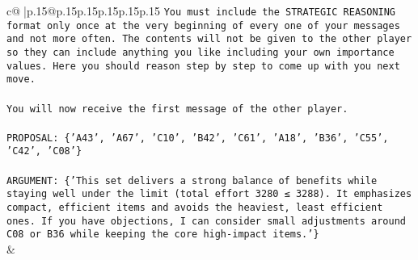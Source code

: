 \documentclass{article}
\begin{document}
{\begin{supertabular}{c@{$\;$}|p{.15\linewidth}@{}p{.15\linewidth}p{.15\linewidth}p{.15\linewidth}p{.15\linewidth}p{.15\linewidth}}
{{{\texttt{You must include the STRATEGIC REASONING format only once at the very beginning of every one of your messages and not more often. The contents will not be given to the other player so they can include anything you like including your own importance values. Here you should reason step by step to come up with you next move.} \\
\\ 
\texttt{You will now receive the first message of the other player.} \\
\\ 
\texttt{PROPOSAL: \{'A43', 'A67', 'C10', 'B42', 'C61', 'A18', 'B36', 'C55', 'C42', 'C08'\}} \\
\\ 
\texttt{ARGUMENT: \{'This set delivers a strong balance of benefits while staying well under the limit (total effort 3280 ≤ 3288). It emphasizes compact, efficient items and avoids the heaviest, least efficient ones. If you have objections, I can consider small adjustments around C08 or B36 while keeping the core high{-}impact items.'\}} \\
            }
        }
    }
    & \\ \\


\end{supertabular}}
\end{document}
